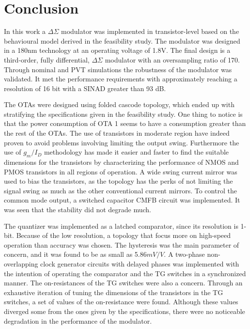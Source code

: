 \chapter{Conclusion}\label{Conclusion}

In this work a $\Delta\Sigma$ modulator was implemented in transistor-level based on the behavioural model derived in the feasibility study. The modulator was designed in a 180nm technology at an operating voltage of 1.8V. The final design is a third-order, fully differential, $\Delta\Sigma$ modulator with an oversampling ratio of 170. Through nominal and PVT simulations the robustness of the modulator was validated. It met the performance requirements with approximately reaching a resolution of 16 bit with a SINAD greater than 93 dB.

The OTAs were designed using folded cascode topology, which ended up with stratifying the specifications given in the feasibility study. One thing to notice is that the power consumption of OTA 1 seems to have a consumption greater than the rest of the OTAs. The use of transistors in moderate region have indeed proven to avoid problems involving limiting the output swing. Furthermore the use of $g_m/I_D$ methodology has made it easier and faster to find the suitable dimensions for the transistors by characterizing the performance of NMOS and PMOS transistors in all regions of operation. A wide swing current mirror was used to bias the transistors, as the topology has the perks of not limiting the signal swing as much as the other conventional current mirrors. To control the common mode output, a switched capacitor CMFB circuit was implemented. It was seen that the stability did not degrade much.  

The quantizer was implemented as a latched comparator, since its resolution is 1-bit. Because of the low resolution, a topology that focus more on high-speed operation than accuracy was chosen. The hysteresis was the main parameter of concern, and it was found to be as small as 5.86$m V/V$. A two-phase non-overlapping clock generator circuits with delayed phases was implemented with the intention of operating the comparator and the TG switches in a synchronized manner. The on-resistances of the TG switches were also a concern. Through an exhaustive iteration of tuning the dimensions of the transistors in the TG switches, a set of values of the on-resistance were found. Although these values diverged some from the ones given by the specifications, there were no noticeable degradation in the performance of the modulator. 

